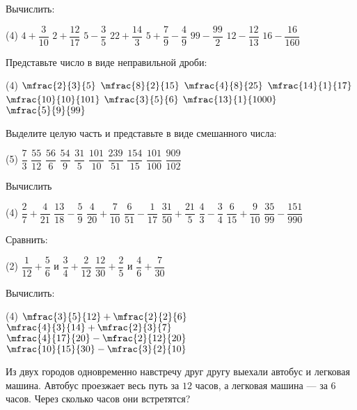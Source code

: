\begin{class}[number=2]
	\begin{listofex}
		\item Вычислить:
		\begin{tasks}(4)
			\task \( 4+\dfrac{3}{10} \)
			\task \( 2+\dfrac{12}{17} \)
			\task \( 5-\dfrac{3}{5} \)
			\task \( 22+\dfrac{14}{3} \)
			\task \( 5+\dfrac{7}{9}-\dfrac{4}{9} \)
			\task \( 99-\dfrac{99}{2} \)
			\task \( 12-\dfrac{12}{13} \)
			\task \( 16-\dfrac{16}{160} \)
		\end{tasks}
		\item Представьте число в виде неправильной дроби:
		\begin{tasks}(4)
			\task \( \mfrac{2}{3}{5} \)
			\task \( \mfrac{8}{2}{15} \)
			\task \( \mfrac{4}{8}{25} \)
			\task \( \mfrac{14}{1}{17} \)
			\task \( \mfrac{10}{10}{101} \)
			\task \( \mfrac{3}{5}{6} \)
			\task \( \mfrac{13}{1}{1000} \)
			\task \( \mfrac{5}{9}{99} \)
		\end{tasks}
		\item Выделите целую часть и представьте в виде смешанного числа:
		\begin{tasks}(5)
			\task \( \dfrac{7}{3} \)
			\task \( \dfrac{55}{12} \)
			\task \( \dfrac{56}{6} \)
			\task \( \dfrac{54}{9} \)
			\task \( \dfrac{31}{5} \)
			\task \( \dfrac{101}{10} \)
			\task \( \dfrac{239}{51} \)
			\task \( \dfrac{154}{15} \)
			\task \( \dfrac{101}{100} \)
			\task \( \dfrac{909}{102} \)
		\end{tasks}
		\item Вычислить
		\begin{tasks}(4)
			\task \( \dfrac{2}{7}+\dfrac{4}{21} \)
			\task \( \dfrac{13}{18}-\dfrac{5}{9} \)
			\task \( \dfrac{4}{20}+\dfrac{7}{10} \)
			\task \( \dfrac{6}{51}-\dfrac{1}{17} \)
			\task \( \dfrac{31}{50}+\dfrac{21}{5} \)
			\task \( \dfrac{4}{3}-\dfrac{3}{4} \)
			\task \( \dfrac{6}{15}+\dfrac{9}{10} \)
			\task \( \dfrac{35}{99}-\dfrac{151}{990} \)
		\end{tasks}
		\item Сравнить:
		\begin{tasks}(2)
			\task \( \dfrac{1}{12}+\dfrac{5}{6} \) и \( \dfrac{3}{4}+\dfrac{2}{12} \)
			\task \( \dfrac{12}{30}+\dfrac{2}{5} \) и \( \dfrac{4}{6}+\dfrac{7}{30} \)
		\end{tasks}
		\item Вычислить:
		\begin{tasks}(4)
			\task \( \mfrac{3}{5}{12}+\mfrac{2}{2}{6} \)
			\task \( \mfrac{4}{3}{14}+\mfrac{2}{3}{7} \)
			\task \( \mfrac{4}{17}{20}-\mfrac{2}{12}{20} \)
			\task \( \mfrac{10}{15}{30}-\mfrac{3}{2}{10} \)
		\end{tasks}
		\item Из двух городов одновременно навстречу друг другу выехали автобус и легковая
		машина. Автобус проезжает весь путь за \( 12 \) часов, а легковая машина --- за \( 6 \) часов. Через сколько часов они встретятся?
	\end{listofex}
\end{class}
